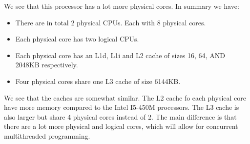 We see that this processor has a lot more physical cores. In summary we have:

\begin{itemize}
    \item There are in total 2 physical CPUs. Each with 8 physical cores.
    \item Each physical core has two logical CPUs.
    \item Each physical core has an L1d, L1i and L2 cache of sizes 16, 64, AND 2048KB respectively.
    \item Four physical cores share one L3 cache of size 6144KB.
\end{itemize}

We see that the caches are somewhat similar. The L2 cache fo each physical core
have more memory compared to the Intel I5-450M processors. The L3 cache is also 
larger but share 4 physical cores instead of 2. The main difference is that 
there are a lot more physical and logical cores, which will allow for concurrent
multithreaded programming.
